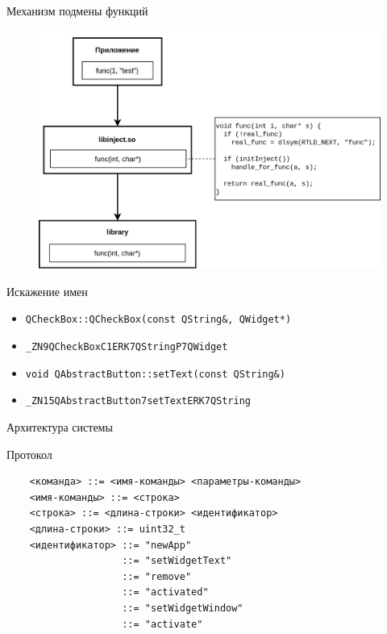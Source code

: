 \documentclass[aspectratio=1610]{beamer}
\begin{document}
\begin{frame}{Механизм подмены функций}
	\begin{figure}
		\includegraphics[height=0.8\textheight]{inject}
	\end{figure}
\end{frame}

\begin{frame}{Искажение имен}
	\begin{itemize}
		\item \texttt{QCheckBox::QCheckBox(const QString\&, QWidget*)}
		\item \texttt{\_ZN9QCheckBoxC1ERK7QStringP7QWidget}
	\end{itemize}
	\vspace{0.7cm}
	\begin{itemize}
		\item \texttt{void QAbstractButton::setText(const QString\&)}
		\item \texttt{\_ZN15QAbstractButton7setTextERK7QString}
	\end{itemize}
\end{frame}

\begin{frame}{Архитектура системы}
	\begin{figure}
		\centering
		
	\end{figure}
\end{frame}

\begin{frame}[fragile]{Протокол}
	\begin{verbatim}
    <команда> ::= <имя-­команды> <параметры-­команды>
    <имя-­команды> ::= <строка>
    <строка> ::= <длина-­строки> <идентификатор>
    <длина-­строки> ::= uint32_t
    <идентификатор> ::= "newApp"
                    ::= "setWidgetText"
                    ::= "remove"
                    ::= "activated"
                    ::= "setWidgetWindow"
                    ::= "activate"
	\end{verbatim}
\end{frame}
\end{document}

